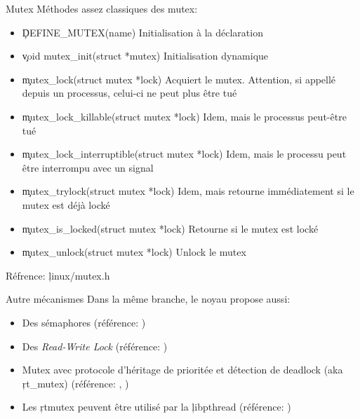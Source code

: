 \begin{frame}{Mutex}
  Méthodes assez classiques des mutex:
  \begin{itemize}
  \item \c{DEFINE_MUTEX(name)} Initialisation à la déclaration
  \item \c{void mutex_init(struct *mutex)} Initialisation dynamique
  \item    \c{mutex_lock(struct     mutex    *lock)}    Acquiert    le
    mutex. Attention, si appellé depuis un processus, celui-ci ne peut
    plus être tué
  \item  \c{mutex_lock_killable(struct  mutex  *lock)} Idem,  mais  le
    processus peut-être tué
  \item \c{mutex_lock_interruptible(struct mutex *lock)} Idem, mais le
    processu peut être interrompu avec un signal
  \item  \c{mutex_trylock(struct  mutex  *lock)} Idem,  mais  retourne
    immédiatement si le mutex est déjà locké
  \item \c{mutex_is_locked(struct  mutex *lock)} Retourne  si le mutex
    est locké
  \item \c{mutex_unlock(struct mutex *lock)} Unlock le mutex
  \end{itemize}
  Réfrence: \c{linux/mutex.h}
\end{frame} 

\begin{frame}[fragile=singleslide]{Autre mécanismes}
Dans la même branche, le noyau propose aussi:
\begin{itemize} 
\item Des sémaphores (référence: )
\item Des \emph{Read-Write Lock} (référence: )
\item  Mutex avec protocole  d'héritage de  prioritée et  détection de
  deadlock           (aka           \c{rt_mutex})          (référence:
  , )
\item  Les   \c{rtmutex}  peuvent  être  utilisé   par  la  \c{libpthread}
  (référence:                         
  )
\end{itemize} 
\end{frame} 

